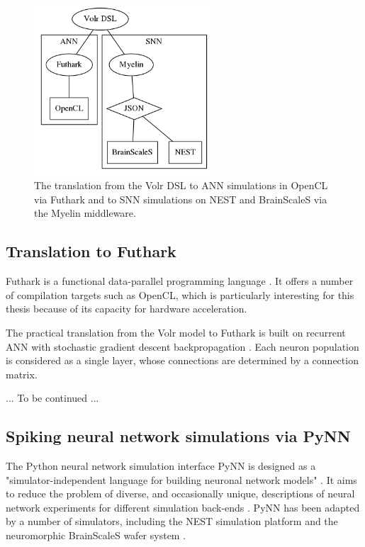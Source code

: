 \begin{figure}
  \centering
  \includegraphics[width=0.6\textwidth]{images/volr-architecture.png}
  \caption{The translation from the Volr DSL to \gls{ANN} simulations in OpenCL via
    \gls{Futhark} and to \gls{SNN} simulations on \gls{NEST} and \gls{BrainScaleS}
    via the \gls{Myelin} middleware.
  }
  \label{fig:volr}
\end{figure}

\subsection{Translation to Futhark} \label{sec:volr-futhark}
Futhark is a functional data-parallel programming language \autocite{Henriksen2017}.
It offers a number of compilation targets such as \gls{OpenCL}, which is
particularly interesting for this thesis because of its capacity for hardware
acceleration.

The practical translation from the Volr model to Futhark is built on recurrent
\gls{ANN} with stochastic gradient descent backpropagation
\autocite{russel2007, schmidhuber2014}.
Each neuron population is considered as a single layer, whose connections are
determined by a connection matrix.


... To be continued ...

\subsection{Spiking neural network simulations via PyNN} \label{sec:volr-pynn}
The Python neural network simulation interface PyNN is designed as a
"simulator-independent language for building neuronal network models"
\autocite{PyNN2018}.
It aims to reduce the problem of diverse, and occasionally unique, descriptions
of neural network experiments for different simulation back-ends \autocite{Davison2009}.
PyNN has been adapted by a number of simulators, including the NEST simulation
platform and the neuromorphic BrainScaleS wafer system
\autocite{Davison2009, Helias2012, Schmitt2017}.

